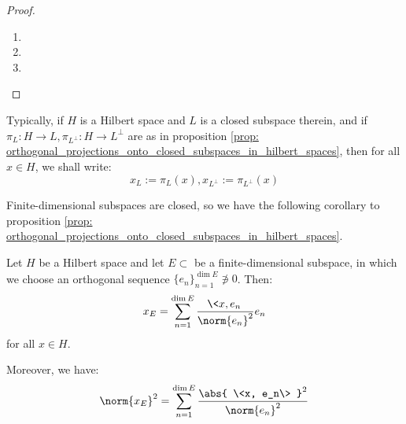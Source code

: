             \begin{proof}
                \begin{enumerate}
                    \item 
                    \item 
                    \item 
                \end{enumerate}
            \end{proof}
        \begin{convention}
            Typically, if $H$ is a Hilbert space and $L$ is a closed subspace therein, and if $\pi_L: H \to L, \pi_{L^{\perp}}: H \to L^{\perp}$ are as in proposition \ref{prop: orthogonal_projections_onto_closed_subspaces_in_hilbert_spaces}, then for all $x \in H$, we shall write:
                $$x_L := \pi_L(x), x_{L^{\perp}} := \pi_{L^{\perp}}(x)$$
        \end{convention}
        Finite-dimensional subspaces are closed, so we have the following corollary to proposition \ref{prop: orthogonal_projections_onto_closed_subspaces_in_hilbert_spaces}.
        \begin{corollary} \label{coro: orthogonal_projections_onto_finite_dimensional_subspaces_in_hilbert_spaces}
            Let $H$ be a Hilbert space and let $E \subset $ be a finite-dimensional subspace, in which we choose an orthogonal sequence $\{e_n\}_{n = 1}^{\dim E} \not \ni 0$. Then:
                $$x_E = \sum_{n = 1}^{\dim E} \frac{\<x, e_n\>}{\norm{e_n}^2} e_n$$
            for all $x \in H$.

            Moreover, we have:
                $$\norm{x_E}^2 = \sum_{n = 1}^{\dim E} \frac{ \abs{ \<x, e_n\> }^2 }{\norm{e_n}^2}$$
        \end{corollary}
